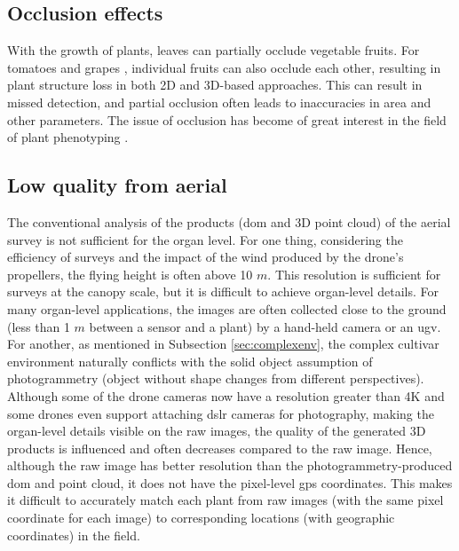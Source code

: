 \subsection{Occlusion effects}
With the growth of plants, leaves can partially occlude vegetable fruits. For tomatoes \citep[Fig.~2a]{yamamoto_plant_2014} and grapes \citep[Fig.~1]{liang_segmentation_2022}, individual fruits can also occlude each other, resulting in plant structure loss in both 2D and 3D-based approaches. This can result in missed detection, and partial occlusion often leads to inaccuracies in area and other parameters. The issue of occlusion has become of great interest in the field of plant phenotyping \citep{blok_image_2021, boogaard_robust_2020, lehnert_3d_2019}.

\subsection{Low quality from aerial}
The conventional analysis of the products (\gls{dom} and 3D point cloud) of the aerial survey is not sufficient for the organ level. 
For one thing, considering the efficiency of surveys and the impact of the wind produced by the drone's propellers, the flying height is often above 10 $m$. This resolution is sufficient for surveys at the canopy scale, but it is difficult to achieve organ-level details. For many organ-level applications, the images are often collected close to the ground (less than 1 $m$ between a sensor and a plant) by a hand-held camera or an \gls{ugv}.
For another, as mentioned in Subsection \ref{sec:complexenv}, the complex cultivar environment naturally conflicts with the solid object assumption of photogrammetry (object without shape changes from different perspectives). Although some of the drone cameras now have a resolution greater than 4K and some drones even support attaching \gls{dslr} cameras for photography, making the organ-level details visible on the raw images, the quality of the generated 3D products is influenced and often decreases compared to the raw image.
Hence, although the raw image has better resolution than the photogrammetry-produced \gls{dom} and point cloud, it does not have the pixel-level \gls{gps} coordinates. This makes it difficult to accurately match each plant from raw images (with the same pixel coordinate for each image) to corresponding locations (with geographic coordinates) in the field.
